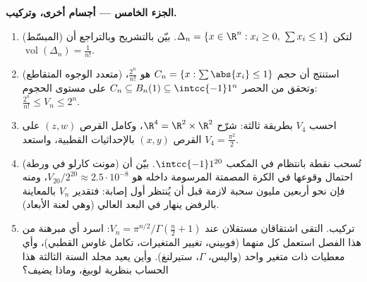 \begin{problem}[{مسألة نهاية الأسبوع --- $V_n =
\pi^{n/2}/\Gamma(\frac n2 + 1)$، وغرابة الأبعاد
العليا}]
\medskip
\noindent\textbf{الجزء الخامس --- أجسام أخرى، وتركيب.}
\begin{enumerate}[resume]
  \item (المبسّط) لتكن $\Delta_n = \{x \in \R^n : x_i \geq 0,\
        \sum x_i \leq 1\}$. بيّن بالتشريح وبالتراجع أن $\operatorname{vol}(\Delta_n) = \frac1{n!}$.
  \item (متعدد الوجوه المتقاطع) استنتج أن حجم $C_n = \{x :
        \sum\abs{x_i} \leq 1\}$ هو $\frac{2^n}{n!}$،
        وتحقق من الحصر $C_n \subseteq B_n(1)
        \subseteq \intcc{-1}1^n$ على مستوى الحجوم: $\frac{2^n}{n!} \leq V_n \leq 2^n$.
  \item احسب $V_4$ بطريقة ثالثة: شرّح $\R^4 = \R^2 \times
        \R^2$، وكامل  القرص
        $(z, w)$ على القرص $(x, y)$ بالإحداثيات القطبية، واستعد $V_4 = \frac{\pi^2}2$.
  \item (مونت كارلو في ورطة) تُسحب نقطة بانتظام في المكعب $\intcc{-1}1^{20}$.
        بيّن أن احتمال وقوعها في الكرة المصمتة المرسومة داخله هو
        $V_{20}/2^{20} \approx 2.5\cdot10^{-8}$، ومنه فإن نحو أربعين مليون سحبة لازمة قبل أن يُنتظر
        أول إصابة: فتقدير $V_n$ بالمعاينة بالرفض ينهار في البعد
        العالي (وهي لعنة الأبعاد).
  \item تركيب. التقى اشتقاقان مستقلان عند $V_n =
        \pi^{n/2}/\Gamma(\frac n2 + 1)$: اسرد أي مبرهنة
        من هذا الفصل استعمل كل منهما (فوبيني، تغيير المتغيرات،
        تكامل غاوس القطبي)، وأي معطيات ذات متغير واحد (واليس،
        $\Gamma$، ستيرلنغ). وأين يعيد مجلد السنة الثالثة هذا الحساب
        بنظرية لوبيغ، وماذا يضيف؟
\end{enumerate}
\end{problem}
